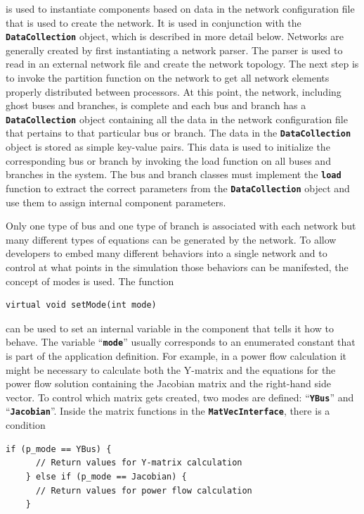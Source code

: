 \documentclass[12pt]{report} %
\begin{document}
is used to instantiate components based on data in the network configuration file that is used to create the network. It is used in conjunction with the \texttt{\textbf{DataCollection}} object, which is described in more detail below. Networks are generally created by first instantiating a network parser. The parser is used to read in an external network file and create the network topology. The next step is to invoke the partition function on the network to get all network elements properly distributed between processors. At this point, the network, including ghost buses and branches, is complete and each bus and branch has a \texttt{\textbf{DataCollection}} object containing all the data in the network configuration file that pertains to that particular bus or branch. The data in the \texttt{\textbf{DataCollection}} object is stored as simple key-value pairs. This data is used to initialize the corresponding bus or branch by invoking the load function on all buses and branches in the system. The bus and branch classes must implement the \texttt{\textbf{load}} function to extract the correct parameters from the \texttt{\textbf{DataCollection}} object and use them to assign internal component parameters.

Only one type of bus and one type of branch is associated with each network but many different types of equations can be generated by the network. To allow developers to embed many different behaviors into a single network and to control at what points in the simulation those behaviors can be manifested, the concept of modes is used. The function

{
\color{red}
\begin{Verbatim}[fontseries=b]
virtual void setMode(int mode)
\end{Verbatim}
}

can be used to set an internal variable in the component that tells it how to behave. The variable ``\texttt{\textbf{mode}}'' usually corresponds to an enumerated constant that is part of the application definition. For example, in a power flow calculation it might be necessary to calculate both the Y-matrix and the equations for the power flow solution containing the Jacobian matrix and the right-hand side vector. To control which matrix gets created, two modes are defined: ``\texttt{\textbf{YBus}}'' and ``\texttt{\textbf{Jacobian}}''. Inside the matrix functions in the \texttt{\textbf{MatVecInterface}}, there is a condition

{
\color{red}
\begin{Verbatim}[fontseries=b]
    if (p_mode == YBus) {
      // Return values for Y-matrix calculation
    } else if (p_mode == Jacobian) {
      // Return values for power flow calculation
    }
\end{Verbatim}
}
\end{document}
